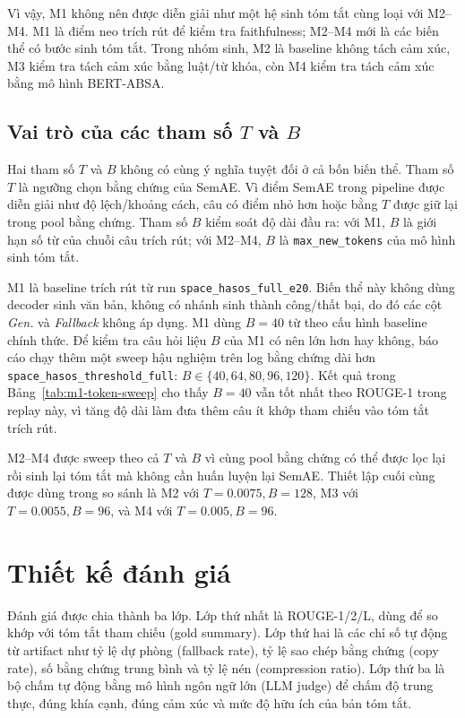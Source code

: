 \documentclass[12pt,a4paper]{report}
\begin{document}
Vì vậy, M1 không nên được diễn giải như một hệ sinh tóm tắt cùng loại với M2--M4. M1 là điểm neo trích rút để kiểm tra faithfulness; M2--M4 mới là các biến thể có bước sinh tóm tắt. Trong nhóm sinh, M2 là baseline không tách cảm xúc, M3 kiểm tra tách cảm xúc bằng luật/từ khóa, còn M4 kiểm tra tách cảm xúc bằng mô hình BERT-ABSA.



\subsection{Vai trò của các tham số $T$ và $B$}

Hai tham số $T$ và $B$ không có cùng ý nghĩa tuyệt đối ở cả bốn biến thể. Tham số $T$ là ngưỡng chọn bằng chứng của SemAE. Vì điểm SemAE trong pipeline được diễn giải như độ lệch/khoảng cách, câu có điểm nhỏ hơn hoặc bằng $T$ được giữ lại trong pool bằng chứng. Tham số $B$ kiểm soát độ dài đầu ra: với M1, $B$ là giới hạn số từ của chuỗi câu trích rút; với M2--M4, $B$ là \texttt{max\_new\_tokens} của mô hình sinh tóm tắt.

M1 là baseline trích rút từ run \texttt{space\_hasos\_full\_e20}. Biến thể này không dùng decoder sinh văn bản, không có nhánh sinh thành công/thất bại, do đó các cột \textit{Gen.} và \textit{Fallback} không áp dụng. M1 dùng $B=40$ từ theo cấu hình baseline chính thức. Để kiểm tra câu hỏi liệu $B$ của M1 có nên lớn hơn hay không, báo cáo chạy thêm một sweep hậu nghiệm trên log bằng chứng dài hơn \texttt{space\_hasos\_threshold\_full}: $B \in \{40,64,80,96,120\}$. Kết quả trong Bảng~\ref{tab:m1-token-sweep} cho thấy $B=40$ vẫn tốt nhất theo ROUGE-1 trong replay này, vì tăng độ dài làm đưa thêm câu ít khớp tham chiếu vào tóm tắt trích rút.

M2--M4 được sweep theo cả $T$ và $B$ vì cùng pool bằng chứng có thể được lọc lại rồi sinh lại tóm tắt mà không cần huấn luyện lại SemAE. Thiết lập cuối cùng được dùng trong so sánh là M2 với $T=0.0075, B=128$, M3 với $T=0.0055, B=96$, và M4 với $T=0.005, B=96$.

\section{Thiết kế đánh giá}

Đánh giá được chia thành ba lớp. Lớp thứ nhất là ROUGE-1/2/L, dùng để so khớp với tóm tắt tham chiếu (gold summary). Lớp thứ hai là các chỉ số tự động từ artifact như tỷ lệ dự phòng (fallback rate), tỷ lệ sao chép bằng chứng (copy rate), số bằng chứng trung bình và tỷ lệ nén (compression ratio). Lớp thứ ba là bộ chấm tự động bằng mô hình ngôn ngữ lớn (LLM judge) để chấm độ trung thực, đúng khía cạnh, đúng cảm xúc và mức độ hữu ích của bản tóm tắt.
\end{document}
